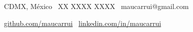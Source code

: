 \documentclass{resume}
\begin{document}
  \hypersetup{pageanchor=false}


  \vspace{1em}

  \contactPersonal%
      {\faMapMarker \ CDMX, México}
      {\faMobile \ XX XXXX XXXX}
      {\faEnvelopeO \ maucarrui@gmail.com}

  \vspace{1em}

  \contactSocial%
      {\faGithub
       \ \href{https://github.com/maucarrui}{github.com/maucarrui}}
      {\faLinkedinSquare
       \ \href{https://linkedin.com/in/maucarrui}{linkedin.com/in/maucarrui}}

  \setlength{\columnsep}{2.5em}
\end{document}
